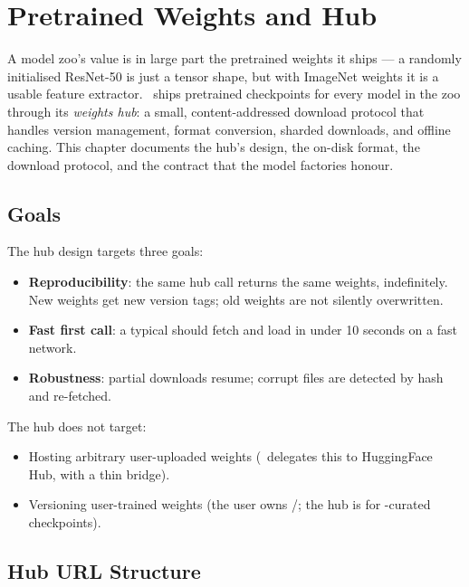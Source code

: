 \chapter{Pretrained Weights and Hub}
\label{ch:pretrained}

A model zoo's value is in large part the pretrained weights it
ships --- a randomly initialised ResNet-50 is just a tensor
shape, but with ImageNet weights it is a usable feature
extractor. \Lucid\ ships pretrained checkpoints for every
model in the zoo through its \emph{weights hub}: a small,
content-addressed download protocol that handles version
management, format conversion, sharded downloads, and offline
caching. This chapter documents the hub's design, the on-disk
format, the download protocol, and the
 contract that the model factories
honour.

\section{Goals}
\label{sec:pretrained:goals}

The hub design targets three goals:

\begin{itemize}
  \item \textbf{Reproducibility}: the same hub call returns
    the same weights, indefinitely. New weights get new
    version tags; old weights are not silently overwritten.
  \item \textbf{Fast first call}: a typical
     should fetch and load
    in under 10 seconds on a fast network.
  \item \textbf{Robustness}: partial downloads resume; corrupt
    files are detected by hash and re-fetched.
\end{itemize}

The hub does not target:
\begin{itemize}
  \item Hosting arbitrary user-uploaded weights (\Lucid\
    delegates this to HuggingFace Hub, with a thin
     bridge).
  \item Versioning user-trained weights (the user owns
    /; the hub is for
    \Lucid-curated checkpoints).
\end{itemize}

\section{Hub URL Structure}
\label{sec:pretrained:url_structure}

